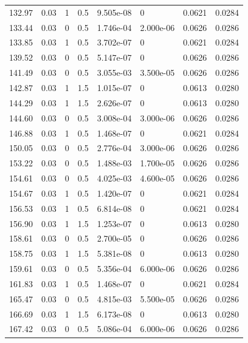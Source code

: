 \documentclass[preview]{standalone}
\begin{document}
{{{\begin{tabular}{L{1.2cm}C{1.2cm} C{0.3cm}C{0.5cm} C{1.4cm}C{1.4cm} C{1.4cm}C{1.4cm}}
  132.97  &  0.03  & 1     & 0.5 &  9.505e-08  & 0  & 0.0621 &  0.0284   \\ 
  133.44  &  0.03  & 0     & 0.5 &  1.746e-04  & 2.000e-06  & 0.0626 &  0.0286   \\ 
  133.85  &  0.03  & 1     & 0.5 &  3.702e-07  & 0  & 0.0621 &  0.0284   \\ 
  139.52  &  0.03  & 0     & 0.5 &  5.147e-07  & 0  & 0.0626 &  0.0286   \\ 
  141.49  &  0.03  & 0     & 0.5 &  3.055e-03  & 3.500e-05  & 0.0626 &  0.0286   \\ 
  142.87  &  0.03  & 1     & 1.5 &  1.015e-07  & 0  & 0.0613 &  0.0280   \\ 
  144.29  &  0.03  & 1     & 1.5 &  2.626e-07  & 0  & 0.0613 &  0.0280   \\ 
  144.60  &  0.03  & 0     & 0.5 &  3.008e-04  & 3.000e-06  & 0.0626 &  0.0286   \\ 
  146.88  &  0.03  & 1     & 0.5 &  1.468e-07  & 0  & 0.0621 &  0.0284   \\ 
  150.05  &  0.03  & 0     & 0.5 &  2.776e-04  & 3.000e-06  & 0.0626 &  0.0286   \\ 
  153.22  &  0.03  & 0     & 0.5 &  1.488e-03  & 1.700e-05  & 0.0626 &  0.0286   \\ 
  154.61  &  0.03  & 0     & 0.5 &  4.025e-03  & 4.600e-05  & 0.0626 &  0.0286   \\ 
  154.67  &  0.03  & 1     & 0.5 &  1.420e-07  & 0  & 0.0621 &  0.0284   \\ 
  156.53  &  0.03  & 1     & 0.5 &  6.814e-08  & 0  & 0.0621 &  0.0284   \\ 
  156.90  &  0.03  & 1     & 1.5 &  1.253e-07  & 0  & 0.0613 &  0.0280   \\ 
  158.61  &  0.03  & 0     & 0.5 &  2.700e-05  & 0  & 0.0626 &  0.0286   \\ 
  158.75  &  0.03  & 1     & 1.5 &  5.381e-08  & 0  & 0.0613 &  0.0280   \\ 
  159.61  &  0.03  & 0     & 0.5 &  5.356e-04  & 6.000e-06  & 0.0626 &  0.0286   \\ 
  161.83  &  0.03  & 1     & 0.5 &  1.468e-07  & 0  & 0.0621 &  0.0284   \\ 
  165.47  &  0.03  & 0     & 0.5 &  4.815e-03  & 5.500e-05  & 0.0626 &  0.0286   \\ 
  166.69  &  0.03  & 1     & 1.5 &  6.173e-08  & 0  & 0.0613 &  0.0280   \\ 
  167.42  &  0.03  & 0     & 0.5 &  5.086e-04  & 6.000e-06  & 0.0626 &  0.0286   \\ 

\end{tabular}}}}
\end{document}
